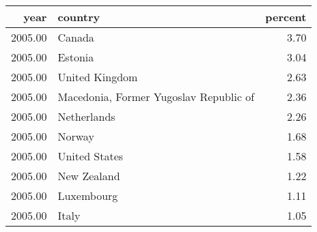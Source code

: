 \begin{table}[ht]
\centering
\begin{tabular}{rlr}
  \hline
year & country & percent \\ 
  \hline
2005.00 & Canada & 3.70 \\ 
  2005.00 & Estonia & 3.04 \\ 
  2005.00 & United Kingdom & 2.63 \\ 
  2005.00 & Macedonia, Former Yugoslav Republic of & 2.36 \\ 
  2005.00 & Netherlands & 2.26 \\ 
  2005.00 & Norway & 1.68 \\ 
  2005.00 & United States & 1.58 \\ 
  2005.00 & New Zealand & 1.22 \\ 
  2005.00 & Luxembourg & 1.11 \\ 
  2005.00 & Italy & 1.05 \\ 
   \hline
\end{tabular}
\end{table}
